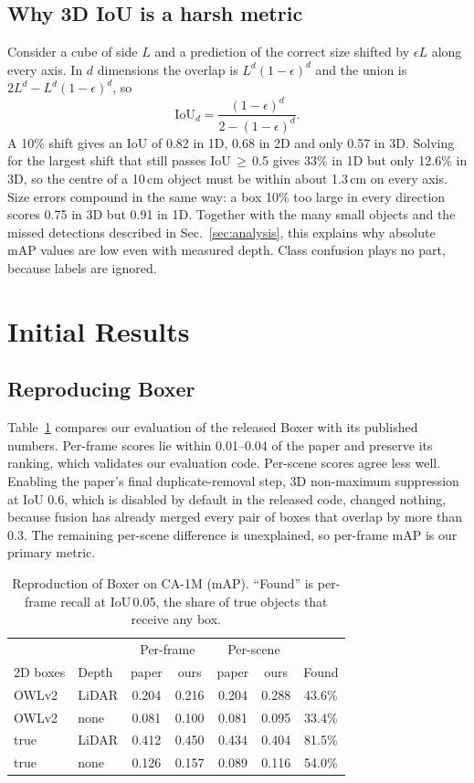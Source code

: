 \documentclass[conference]{IEEEtran}
\begin{document}
\subsection{Why 3D IoU is a harsh metric}
\label{sec:iou}
Consider a cube of side $L$ and a prediction of the correct size shifted by $\epsilon L$ along every axis. In $d$ dimensions the overlap is $L^d(1-\epsilon)^d$ and the union is $2L^d-L^d(1-\epsilon)^d$, so
\begin{equation}
\mathrm{IoU}_d=\frac{(1-\epsilon)^d}{2-(1-\epsilon)^d}.
\end{equation}
A 10\% shift gives an IoU of 0.82 in 1D, 0.68 in 2D and only 0.57 in 3D. Solving for the largest shift that still passes IoU\,$\ge$\,0.5 gives 33\% in 1D but only 12.6\% in 3D, so the centre of a 10\,cm object must be within about 1.3\,cm on every axis. Size errors compound in the same way: a box 10\% too large in every direction scores 0.75 in 3D but 0.91 in 1D. Together with the many small objects and the missed detections described in Sec.~\ref{sec:analysis}, this explains why absolute mAP values are low even with measured depth. Class confusion plays no part, because labels are ignored.

\section{Initial Results}
\label{sec:results}
\subsection{Reproducing Boxer}
Table~\ref{tab:repro} compares our evaluation of the released Boxer with its published numbers. Per-frame scores lie within 0.01--0.04 of the paper and preserve its ranking, which validates our evaluation code. Per-scene scores agree less well. Enabling the paper's final duplicate-removal step, 3D non-maximum suppression at IoU 0.6, which is disabled by default in the released code, changed nothing, because fusion has already merged every pair of boxes that overlap by more than 0.3. The remaining per-scene difference is unexplained, so per-frame mAP is our primary metric.

\begin{table}[t]
\caption{Reproduction of Boxer on CA-1M (mAP). ``Found'' is per-frame recall at IoU\,0.05, the share of true objects that receive any box.}
\label{tab:repro}
\centering
\setlength{\tabcolsep}{3.5pt}
\begin{tabular}{llccccc}
\toprule
& & \multicolumn{2}{c}{Per-frame} & \multicolumn{2}{c}{Per-scene} & \\
2D boxes & Depth & paper & ours & paper & ours & Found \\
\midrule
OWLv2 & LiDAR & 0.204 & 0.216 & 0.204 & 0.288 & 43.6\% \\
OWLv2 & none  & 0.081 & 0.100 & 0.081 & 0.095 & 33.4\% \\
true  & LiDAR & 0.412 & 0.450 & 0.434 & 0.404 & 81.5\% \\
true  & none  & 0.126 & 0.157 & 0.089 & 0.116 & 54.0\% \\
\bottomrule
\end{tabular}
\end{table}
\end{document}
